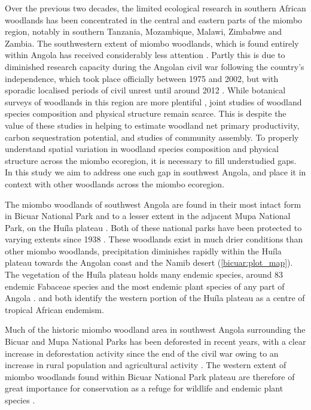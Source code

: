 \begin{refsection}
Over the previous two decades, the limited ecological research in southern African woodlands has been concentrated in the central and eastern parts of the miombo region, notably in southern Tanzania, Mozambique, Malawi, Zimbabwe and Zambia. The southwestern extent of miombo woodlands, which is found entirely within Angola has received considerably less attention \citep{Huntley2019}. Partly this is due to diminished research capacity during the Angolan civil war following the country's independence, which took place officially between 1975 and 2002, but with sporadic localised periods of civil unrest until around 2012 \citep{Oliveira2015}. While botanical surveys of woodlands in this region are more plentiful \citep{Huntley2019, Figueiredo2009}, joint studies of woodland species composition and physical structure remain scarce. This is despite the value of these studies in helping to estimate woodland net primary productivity, carbon sequestration potential, and studies of community assembly. To properly understand spatial variation in woodland species composition and physical structure across the miombo ecoregion, it is necessary to fill understudied gaps. In this study we aim to address one such gap in southwest Angola, and place it in context with other woodlands across the miombo ecoregion.

The miombo woodlands of southwest Angola are found in their most intact form in Bicuar National Park and to a lesser extent in the adjacent Mupa National Park, on the Hu\'{i}la plateau \citep{Chisingui2018}. Both of these national parks have been protected to varying extents since 1938 \cite{Huntley2019}. These woodlands exist in much drier conditions than other miombo woodlands, precipitation diminishes rapidly within the Hu\'{i}la plateau towards the Angolan coast and the Namib desert (\autoref{bicuar:plot_map}). The vegetation of the Hu\'{i}la plateau holds many endemic species, around 83 endemic Fabaceae species \citep{Soares2007} and the most endemic plant species of any part of Angola \citep{Figueiredo2008}. \citet{Linder2001} and \citet{Droissart2018} both identify the western portion of the Hu\'{i}la plateau as a centre of tropical African endemism.

Much of the historic miombo woodland area in southwest Angola surrounding the Bicuar and Mupa National Parks has been deforested in recent years, with a clear increase in deforestation activity since the end of the civil war owing to an increase in rural population and agricultural activity \citep{Schneibel2013, Huntley2019}. The western extent of miombo woodlands found within Bicuar National Park plateau are therefore of great importance for conservation as a refuge for wildlife and endemic plant species \citep{Huntley2019}.


\end{refsection}
